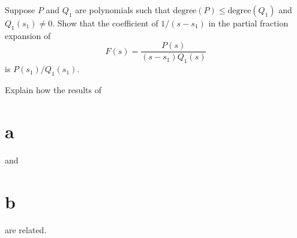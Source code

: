 \begin{exerciselist}
\begin{alist}
    \item %
    Suppose $P$ and $Q_{1}$ are polynomials such that $\mbox{degree}(P)\le\mbox{degree}(Q_{1})$ and
    $Q_{1}(s_{1})\ne0$. Show that the coefficient of $1/(s-s_{1})$ in the partial fraction expansion
    of
    \[
      F(s)=\frac{P(s)}{(s-s_{1})Q_{1}(s)}
    \]
    is $P(s_{1})/Q_{1}(s_{1})$.

    \item %
    Explain how the results of \part{a} and \part{b} are related.
  \end{alist}
\end{exerciselist}
